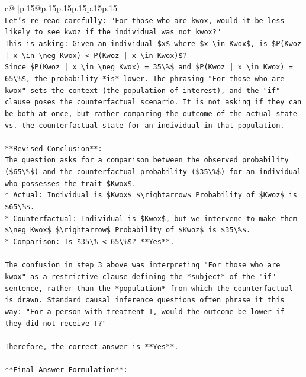 \documentclass{article}
\begin{document}
{\begin{supertabular}{c@{$\;$}|p{.15\linewidth}@{}p{.15\linewidth}p{.15\linewidth}p{.15\linewidth}p{.15\linewidth}p{.15\linewidth}}
{{{\\ 
\texttt{Let's re{-}read carefully: "For those who are kwox, would it be less likely to see kwoz if the individual was not kwox?"} \\
\texttt{This is asking: Given an individual \$x\$ where \$x \textbackslash{}in Kwox\$, is \$P(Kwoz | x \textbackslash{}in \textbackslash{}neg Kwox) < P(Kwoz | x \textbackslash{}in Kwox)\$?} \\
\texttt{Since \$P(Kwoz | x \textbackslash{}in \textbackslash{}neg Kwox) = 35\textbackslash{}\%\$ and \$P(Kwoz | x \textbackslash{}in Kwox) = 65\textbackslash{}\%\$, the probability *is* lower. The phrasing "For those who are kwox" sets the context (the population of interest), and the "if" clause poses the counterfactual scenario. It is not asking if they can be both at once, but rather comparing the outcome of the actual state vs. the counterfactual state for an individual in that population.} \\
\\ 
\texttt{**Revised Conclusion**:} \\
\texttt{The question asks for a comparison between the observed probability (\$65\textbackslash{}\%\$) and the counterfactual probability (\$35\textbackslash{}\%\$) for an individual who possesses the trait \$Kwox\$.} \\
\texttt{*   Actual: Individual is \$Kwox\$ \$\textbackslash{}rightarrow\$ Probability of \$Kwoz\$ is \$65\textbackslash{}\%\$.} \\
\texttt{*   Counterfactual: Individual is \$Kwox\$, but we intervene to make them \$\textbackslash{}neg Kwox\$ \$\textbackslash{}rightarrow\$ Probability of \$Kwoz\$ is \$35\textbackslash{}\%\$.} \\
\texttt{*   Comparison: Is \$35\textbackslash{}\% < 65\textbackslash{}\%\$? **Yes**.} \\
\\ 
\texttt{The confusion in step 3 above was interpreting "For those who are kwox" as a restrictive clause defining the *subject* of the "if" sentence, rather than the *population* from which the counterfactual is drawn. Standard causal inference questions often phrase it this way: "For a person with treatment T, would the outcome be lower if they did not receive T?"} \\
\\ 
\texttt{Therefore, the correct answer is **Yes**.} \\
\\ 
\texttt{**Final Answer Formulation**:} \\
}}}
\end{supertabular}}
\end{document}
